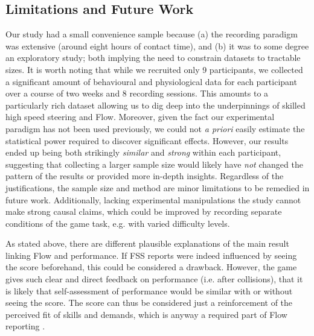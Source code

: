 \documentclass[a4paper,doc,floatsintext,natbib,10pt]{apa6}
\begin{document}
\subsection*{Limitations and Future Work}
Our study had a small convenience sample because (a) the recording paradigm was extensive (around eight hours of contact time), and (b) it was to some degree an exploratory study; both implying the need to constrain datasets to tractable sizes. It is worth noting that while we recruited only 9 participants, we collected a significant amount of behavioural and physiological data for each participant over a course of two weeks and 8 recording sessions. This amounts to a particularly rich dataset allowing us to dig deep into the underpinnings of skilled high speed steering and Flow. Moreover, given the fact our experimental paradigm has not been used previously, we could not {\it a priori} easily estimate the statistical power required to discover significant effects. However, our results ended up being both strikingly {\it similar} and {\it strong} within each participant, suggesting that collecting a larger sample size would likely have {\it not} changed the pattern of the results or provided more in-depth insights. Regardless of the justifications, the sample size and method are minor limitations to be remedied in future work. Additionally, lacking experimental manipulations the study cannot make strong causal claims, which could be improved by recording separate conditions of the game task, e.g. with varied difficulty levels.

As stated above, there are different plausible explanations of the main result linking Flow and performance. If FSS reports were indeed influenced by seeing the score beforehand, this could be considered a drawback. However, the game gives such clear and direct feedback on performance (i.e. after collisions), that it is likely that self-assessment of performance would be similar with or without seeing the score. The score can thus be considered just a reinforcement of the perceived fit of skills and demands, which is anyway a required part of Flow reporting \citep{Keller2012}.
\end{document}
